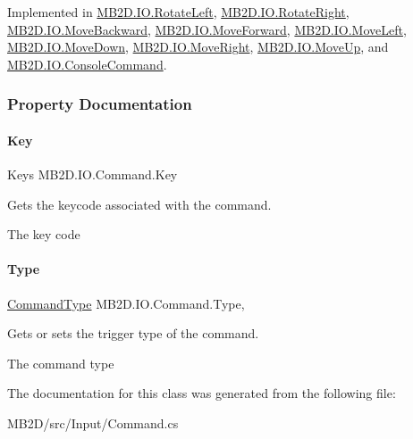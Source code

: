 Implemented in \hyperlink{class_m_b2_d_1_1_i_o_1_1_rotate_left_adf98596b3689a88aaf1334e00b548443}{M\+B2\+D.\+I\+O.\+Rotate\+Left}, \hyperlink{class_m_b2_d_1_1_i_o_1_1_rotate_right_a416106025812db523b009155d462cb6b}{M\+B2\+D.\+I\+O.\+Rotate\+Right}, \hyperlink{class_m_b2_d_1_1_i_o_1_1_move_backward_a15c5da82d35b95c0a04e8fdc89dcd839}{M\+B2\+D.\+I\+O.\+Move\+Backward}, \hyperlink{class_m_b2_d_1_1_i_o_1_1_move_forward_a32d5bfbf101ab8ff8150f2f07f0b5ac8}{M\+B2\+D.\+I\+O.\+Move\+Forward}, \hyperlink{class_m_b2_d_1_1_i_o_1_1_move_left_aa74df62134ee5fc3a5b2503114a5a7e6}{M\+B2\+D.\+I\+O.\+Move\+Left}, \hyperlink{class_m_b2_d_1_1_i_o_1_1_move_down_af93adf7def9f4869528ee2c86b474c19}{M\+B2\+D.\+I\+O.\+Move\+Down}, \hyperlink{class_m_b2_d_1_1_i_o_1_1_move_right_aa0d9913727d27d01dff4fdd394e2f6f4}{M\+B2\+D.\+I\+O.\+Move\+Right}, \hyperlink{class_m_b2_d_1_1_i_o_1_1_move_up_acb3f90aeea44eeffefbb664e898b0a91}{M\+B2\+D.\+I\+O.\+Move\+Up}, and \hyperlink{class_m_b2_d_1_1_i_o_1_1_console_command_ad46e036e534b3b1cd1503782042d358f}{M\+B2\+D.\+I\+O.\+Console\+Command}.



\subsubsection{Property Documentation}
\hypertarget{class_m_b2_d_1_1_i_o_1_1_command_a42f1ab4c0c10b351e296d23713bd0a6a}{}\label{class_m_b2_d_1_1_i_o_1_1_command_a42f1ab4c0c10b351e296d23713bd0a6a} 
\paragraph{\texorpdfstring{Key}{Key}}
{\footnotesize\ttfamily Keys M\+B2\+D.\+I\+O.\+Command.\+Key\hspace{0.3cm}{\ttfamily [get]}}



Gets the keycode associated with the command. 

The key code\hypertarget{class_m_b2_d_1_1_i_o_1_1_command_afd1e0b56bee6e683db89a55c3b155f9b}{}\label{class_m_b2_d_1_1_i_o_1_1_command_afd1e0b56bee6e683db89a55c3b155f9b} 
\paragraph{\texorpdfstring{Type}{Type}}
{\footnotesize\ttfamily \hyperlink{namespace_m_b2_d_1_1_i_o_ab5f95f3fe9e652778b62bdf943168a68}{Command\+Type} M\+B2\+D.\+I\+O.\+Command.\+Type\hspace{0.3cm}{\ttfamily [get]}, {\ttfamily [set]}}



Gets or sets the trigger type of the command. 

The command type

The documentation for this class was generated from the following file\+:\begin{DoxyCompactItemize}
\item 
M\+B2\+D/src/\+Input/Command.\+cs\end{DoxyCompactItemize}
